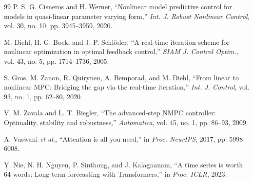 \documentclass[journal]{IEEEtran}
\begin{document}
\begin{thebibliography}{99}
P. S. G. Cisneros and H. Werner, ``Nonlinear model predictive control for models in quasi-linear parameter varying form,'' \emph{Int. J. Robust Nonlinear Control}, vol. 30, no. 10, pp. 3945--3959, 2020.

M. Diehl, H. G. Bock, and J. P. Schl\"oder, ``A real-time iteration scheme for nonlinear optimization in optimal feedback control,'' \emph{SIAM J. Control Optim.}, vol. 43, no. 5, pp. 1714--1736, 2005.

S. Gros, M. Zanon, R. Quirynen, A. Bemporad, and M. Diehl, ``From linear to nonlinear MPC: Bridging the gap via the real-time iteration,'' \emph{Int. J. Control}, vol. 93, no. 1, pp. 62--80, 2020.

V. M. Zavala and L. T. Biegler, ``The advanced-step NMPC controller: Optimality, stability and robustness,'' \emph{Automatica}, vol. 45, no. 1, pp. 86--93, 2009.

A. Vaswani \emph{et al.}, ``Attention is all you need,'' in \emph{Proc. NeurIPS}, 2017, pp. 5998--6008.

Y. Nie, N. H. Nguyen, P. Sinthong, and J. Kalagnanam, ``A time series is worth 64 words: Long-term forecasting with Transformers,'' in \emph{Proc. ICLR}, 2023.

\end{thebibliography}
\end{document}
